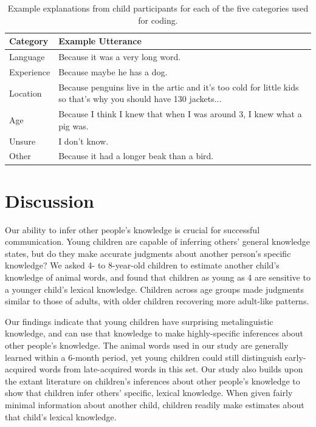 \documentclass[10pt, letterpaper]{article}
\begin{document}
\begin{table}[tb]
\centering
\begin{tabular}{ll}
  \hline
Category & Example Utterance \\ 
  \hline
Language & Because it was a very long word. \\ 
  Experience & Because maybe he has a dog. \\ 
  Location & Because penguins live in the artic and it's too cold for little kids so that's why you should have 130 jackets... \\ 
  Age & Because I think I knew that when I was around 3, I knew what a pig was. \\ 
  Unsure & I don't know. \\ 
  Other & Because it had a longer beak than a bird. \\ 
   \hline
\end{tabular}
\caption{Example explanations from child participants for each of the five categories used for coding.} 
\label{tab:explanations_table}
\end{table}

\hypertarget{discussion}{%
\section{Discussion}\label{discussion}}

Our ability to infer other people's knowledge is crucial for successful
communication. Young children are capable of inferring others' general
knowledge states, but do they make accurate judgments about another
person's specific knowledge? We asked 4- to 8-year-old children to
estimate another child's knowledge of animal words, and found that
children as young as 4 are sensitive to a younger child's lexical
knowledge. Children across age groups made judgments similar to those of
adults, with older children recovering more adult-like patterns.

Our findings indicate that young children have surprising metalinguistic
knowledge, and can use that knowledge to make highly-specific inferences
about other people's knowledge. The animal words used in our study are
generally learned within a 6-month period, yet young children could
still distinguish early-acquired words from late-acquired words in this
set. Our study also builds upon the extant literature on children's
inferences about other people's knowledge to show that children infer
others' specific, lexical knowledge. When given fairly minimal
information about another child, children readily make estimates about
that child's lexical knowledge.
\end{document}
